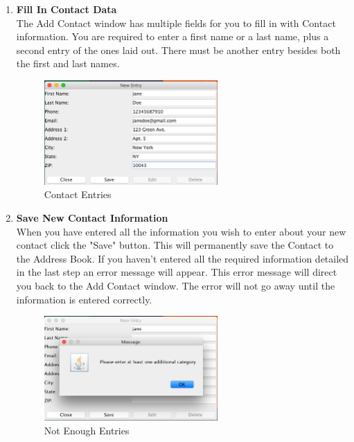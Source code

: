 \documentclass[a4paper, 11pt]{article}
\begin{document}
\begin{enumerate}[label=\textbf{\arabic*})]
    \item{\textbf{Fill In Contact Data}}\\ The Add Contact window has multiple fields for you to fill in with Contact information. You are required to enter a first name or a last name, plus a second entry of the ones laid out. There must be another entry besides both the first and last names.
    
    \begin{figure}[h!]
    \centering
      \includegraphics[width=250]{new_contact_entry.png}
      \caption{Contact Entries}
    \end{figure}
    
    \clearpage
    
    \item{\textbf{Save New Contact Information}}\\ When you have entered all the information you wish to enter about your new contact click the "Save" button. This will permanently save the Contact to the Address Book. If you haven't entered all the required information detailed in the last step an error message will appear. This error message will direct you back to the Add Contact window. The error will not go away until the information is entered correctly.
    
    \begin{figure}[h!]
    \centering
      \includegraphics[width=250]{add_entry_error.png}
      \caption{Not Enough Entries}
    \end{figure}
    

\end{enumerate}
\end{document}
